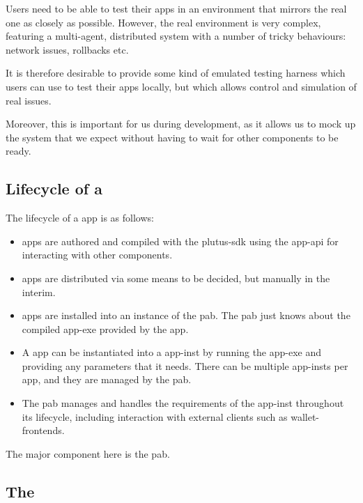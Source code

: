 \begin{requirement}
\label{req:app-emulation}
Users need to be able to test their \glspl{app} in an environment that mirrors the real one as closely as possible.
However, the real environment is very complex, featuring a multi-agent, distributed system with a number of tricky behaviours: network issues, rollbacks etc.

It is therefore desirable to provide some kind of emulated testing harness which users can use to test their \glspl{app} locally, but which allows control and simulation of real issues.

Moreover, this is important for us during development, as it allows us to mock up the system that we expect without having to wait for other components to be ready.
\end{requirement}

\subsection{Lifecycle of a }

The lifecycle of a \gls{app} is as follows:

\begin{itemize}
\item
  \Glspl{app} are authored and compiled with the \gls{plutus-sdk} using the \gls{app-api} for interacting with other components.
\item
  \Glspl{app} are distributed via some means to be decided, but manually in the interim.
\item
  \Glspl{app} are installed into an instance of the \gls{pab}. The \gls{pab} just knows about the compiled \gls{app-exe} provided by the \gls{app}.
\item
  A \gls{app} can be instantiated into a \gls{app-inst} by running the \gls{app-exe} and providing any parameters that it needs.
  There can be multiple \glspl{app-inst} per \gls{app}, and they are managed by the \gls{pab}.
\item
  The \gls{pab} manages and handles the requirements of the \gls{app-inst} throughout its lifecycle, including interaction with external clients such as \glspl{wallet-frontend}.
\end{itemize}

The major component here is the \gls{pab}.

\subsection{The }
\label{sec:pab}

